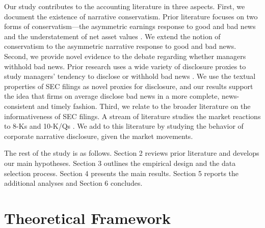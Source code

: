 \documentclass[letterpaper,11pt]{article}
\begin{document}
\begin{spacing}{1.5}
Our study contributes to the accounting literature in three aspects. First, we document the existence of narrative conservatism. Prior literature focuses on two forms of conservatism---the asymmetric earnings response to good and bad news and the understatement of net asset values \cite{basuConservatismPrincipleAsymmetric1997, ballEarningsQualityUK2005, beaverConditionalUnconditionalConservatism2005}. We extend the notion of conservatism to the asymmetric narrative response to good and bad news. 
Second, we provide novel evidence to the debate regarding whether managers withhold bad news. Prior research uses a wide variety of disclosure proxies to study managers' tendency to disclose or withhold bad news \cite{kasznikWarnNotWarn1995, kothariManagersWithholdBad2009, baoManagersDiscloseWithhold2019}. We use the textual properties of SEC filings as novel proxies for disclosure, and our results support the idea that firms on average disclose bad news in a more complete, news-consistent and timely fashion. Third, we relate to the broader literature on the informativeness of SEC filings. A stream of literature studies the market reactions to 8-Ks \cite{carterRelevanceForm8K1999, pinskerHasFirmsForm2006, lermanNewForm8K2010} and 10-K/Qs \cite{alfordExtensionsViolationsStatutory1994, liAnnualReportReadability2008, liInformationContentForwardLooking2010}. We add to this literature by studying the behavior of corporate narrative disclosure, given the market movements.

The rest of the study is as follows. Section 2 reviews prior literature and develops our main hypotheses. Section 3 outlines the empirical design and the data selection process. Section 4 presents the main results. Section 5 reports the additional analyses and Section 6 concludes.

\section{Theoretical Framework}

\end{spacing}
\end{document}

